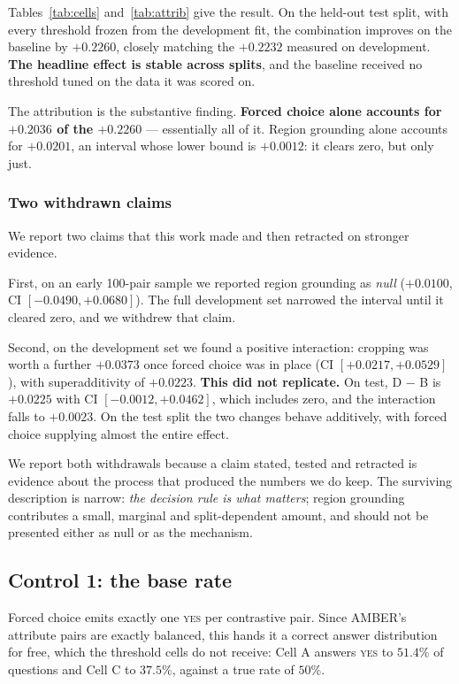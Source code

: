 \documentclass[conference]{IEEEtran}
\begin{document}
Tables~\ref{tab:cells} and~\ref{tab:attrib} give the result. On the held-out
test split, with every threshold frozen from the development fit, the combination
improves on the baseline by $+0.2260$, closely matching the $+0.2232$ measured on
development. \textbf{The headline effect is stable across splits}, and the
baseline received no threshold tuned on the data it was scored on.

The attribution is the substantive finding. \textbf{Forced choice alone accounts
for $+0.2036$ of the $+0.2260$} --- essentially all of it. Region grounding alone
accounts for $+0.0201$, an interval whose lower bound is $+0.0012$: it clears
zero, but only just.

\subsubsection*{Two withdrawn claims}
We report two claims that this work made and then retracted on stronger evidence.

First, on an early 100-pair sample we reported region grounding as \emph{null}
($+0.0100$, CI $[-0.0490, +0.0680]$). The full development set narrowed the
interval until it cleared zero, and we withdrew that claim.

Second, on the development set we found a positive interaction: cropping was
worth a further $+0.0373$ once forced choice was in place
(CI $[+0.0217, +0.0529]$), with superadditivity of $+0.0223$. \textbf{This did
not replicate.} On test, D $-$ B is $+0.0225$ with CI $[-0.0012, +0.0462]$, which
includes zero, and the interaction falls to $+0.0023$. On the test split the two
changes behave additively, with forced choice supplying almost the entire effect.

We report both withdrawals because a claim stated, tested and retracted is
evidence about the process that produced the numbers we do keep. The surviving
description is narrow: \emph{the decision rule is what matters}; region grounding
contributes a small, marginal and split-dependent amount, and should not be
presented either as null or as the mechanism.

\subsection{Control 1: the base rate}

Forced choice emits exactly one \textsc{yes} per contrastive pair. Since AMBER's
attribute pairs are exactly balanced, this hands it a correct answer distribution
for free, which the threshold cells do not receive: Cell A answers \textsc{yes}
to $51.4\%$ of questions and Cell C to $37.5\%$, against a true rate of $50\%$.
\end{document}
